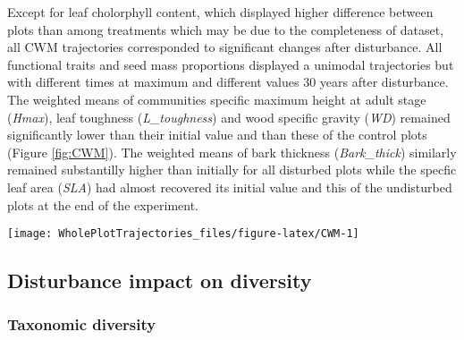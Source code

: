 \documentclass[fleqn,10pt]{ArtEcoFoG} %
\theoremstyle{definition}
\theoremstyle{definition}
\theoremstyle{definition}
\theoremstyle{remark}
\begin{document}
Except for leaf cholorphyll content, which displayed higher difference
between plots than among treatments which may be due to the completeness
of dataset, all CWM trajectories corresponded to significant changes
after disturbance. All functional traits and seed mass proportions
displayed a unimodal trajectories but with different times at maximum
and different values 30 years after disturbance. The weighted means of
communities specific maximum height at adult stage (\emph{Hmax}), leaf
toughness (\emph{L\_toughness}) and wood specific gravity (\emph{WD})
remained significantly lower than their initial value and than these of
the control plots (Figure \ref{fig:CWM}). The weighted means of bark
thickness (\emph{Bark\_thick}) similarly remained substantilly higher
than initially for all disturbed plots while the specfic leaf area
(\emph{SLA}) had almost recovered its initial value and this of the
undisturbed plots at the end of the experiment.

\begin{figure*}

{\centering \texttt{[image: WholePlotTrajectories\_files/figure-latex/CWM-1]} 

}

\caption{Trajectories of the communities weighted means (CWM) over 30 years after disturbance of 4 leaf traits (Leaf thickness, \emph{L\_thickness}, chlorophyll content, \emph{L\_chloro}, toughness, \emph{L\_toughness} and specific area, \emph{SLA}), 2 stem traits (wood specific gravity, \emph{WD}, and bark thickness, \emph{Bark-thick}) and one life trait (Specific maximum height at adult stage, \emph{Hmax}). Trajectories correspond to the median (solid line) and 0.025 and 0.975 percentile (gray envelope) observed after 50 iteration of the taxonomic uncertainty propagation and the missing trait value filling processes. Initial treatments are represented by solid lines colorswith green for control, blue for T1,orange for T2 and red for T3.}\label{fig:CWM}
\end{figure*}

\subsection{Disturbance impact on
diversity}\label{disturbance-impact-on-diversity}

\subsubsection{Taxonomic diversity}\label{taxonomic-diversity}
\end{document}
